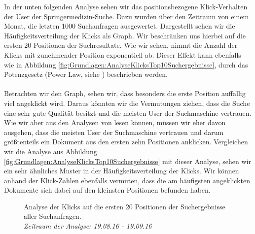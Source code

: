
In der unten folgenden Analyse sehen wir das positionsbezogene Klick-Verhalten der User der Springermedizin-Suche. Dazu wurden über den Zeitraum von einem Monat, die letzten 1000 Suchanfragen ausgewertet. Dargestellt sehen wir die Häufigkeitsverteilung der Klicks als Graph. Wir beschränken uns hierbei auf die ersten 20 Positionen der Suchresultate. Wie wir sehen, nimmt die Anzahl der Klicks mit zunehmender Position exponentiell ab. Dieser Effekt kann ebenfalls wie in Abbildung \ref{fig:Grundlagen:AnalyseKlicksTop10Suchergebnisse}, durch das Potenzgesetz (Power Law, siehe \cite{PowerLaw}) beschrieben werden. 
\\
\\
Betrachten wir den Graph, sehen wir, dass besonders die erste Position auffällig viel angeklickt wird. Daraus könnten wir die Vermutungen ziehen, dass die Suche eine sehr gute Qualität besitzt und die meisten User der Suchmaschine vertrauen. Wie wir aber aus den Analysen von \cite{Joachims} lesen können, müssen wir eher davon ausgehen, dass die meisten User der Suchmaschine vertrauen und darum größtenteils ein Dokument aus den ersten zehn Positionen anklicken. Vergleichen wir die Analyse aus Abbildung \ref{fig:Grundlagen:AnalyseKlicksTop10Suchergebnisse} mit dieser Analyse, sehen wir ein sehr ähnliches Muster in der Häufigkeitsverteilung der Klicks. Wir können anhand der Klick-Zahlen ebenfalls vermuten, dass die am häufigsten angeklickten Dokumente sich dabei auf den kleinsten Positionen befunden haben.

\begin{figure}[H]
\centering 
 
\topRanks
  

\caption[Analyse der Klicks auf die ersten 20 Positionen der Suchergebnisse aller Suchanfragen. \textit{Zeitraum der Analyse: 19.08.16 - 19.09.16}]{Analyse der Klicks auf die ersten 20 Positionen der Suchergebnisse aller Suchanfragen. \\ \textit{Zeitraum der Analyse: 19.08.16 - 19.09.16}}
\label{fig:Grundlage:AnalyseKlicksPositionen}
\end{figure}